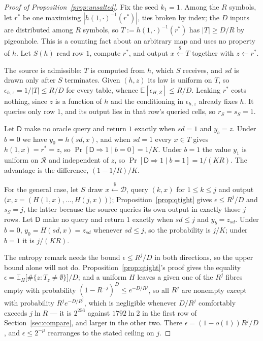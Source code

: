 \documentclass{aicr-solution}
\newcommand{\sd}{\mathit{sd}}
\renewcommand{\sample}{\stackrel{{\scriptscriptstyle\$}}{\leftarrow}}
\newcommand{\calD}{\mathcal{D}}
\newcommand{\calR}{\mathcal{R}}
\begin{document}
\begin{proof}[Proof of Proposition~\ref{prop:unsalted}]
Fix the seed $k_1 = 1$. Among the $R$ symbols, let $r^{*}$ be one maximising
$|h(1,\cdot)^{-1}(r^{*})|$, ties broken by index; the $D$ inputs are distributed among $R$ symbols,
so $T := h(1,\cdot)^{-1}(r^{*})$ has $|T| \ge D/R$ by pigeonhole. This is a counting fact about an
arbitrary map and uses no property of $h$. Let $S(h)$ read row $1$, compute $r^{*}$, and output
$x \sample T$ together with $z \leftarrow r^{*}$.

The source is admissible: $T$ is computed from $h$, which $S$ receives, and $\sd$ is drawn only
after $S$ terminates. Given $(h,z)$ its law is uniform on $T$, so
$\epsilon_{h,z} = 1/|T| \le R/D$ for every table, whence $\mathbb{E}[\epsilon_{H,Z}] \le R/D$.
Leaking $r^{*}$ costs nothing, since $z$ is a function of $h$ and the conditioning in
$\epsilon_{h,z}$ already fixes $h$. It queries only row $1$, and its output lies in that row's
queried cells, so $r_S = s_S = 1$.

Let $\mathsf{D}$ make no oracle query and return $1$ exactly when $\sd = 1$ and $y_b = z$. Under
$b = 0$ we have $y_0 = h(\sd,x)$, and when $\sd = 1$ every $x \in T$ gives $h(1,x) = r^{*} = z$, so
$\Pr[\mathsf{D} \Rightarrow 1 \mid b=0] = 1/K$. Under $b = 1$ the value $y_1$ is uniform on $\calR$
and independent of $z$, so $\Pr[\mathsf{D} \Rightarrow 1 \mid b=1] = 1/(KR)$. The advantage is the
difference, $(1 - 1/R)/K$.

For the general case, let $S$ draw $x \sample \calD$, query $(k,x)$ for $1 \le k \le j$ and output
$\bigl(x, z = (H(1,x),\dots,H(j,x))\bigr)$; Proposition~\ref{prop:qtight} gives
$\epsilon \le R^{j}/D$ and $s_S = j$, the latter because the source queries its own output in
exactly those $j$ rows. Let $\mathsf{D}$ make no query and return $1$ exactly when $\sd \le j$ and
$y_b = z_{\sd}$. Under $b = 0$, $y_0 = H(\sd,x) = z_{\sd}$ whenever $\sd \le j$, so the probability
is $j/K$; under $b = 1$ it is $j/(KR)$.

The entropy remark needs the bound $\epsilon \le R^{j}/D$ in both directions, so the upper bound
alone will not do. Proposition~\ref{prop:qtight}'s proof gives the equality
$\epsilon = \mathbb{E}_{H}\bigl[\#\{z : T_z \neq \emptyset\}\bigr]/D$; and a uniform $H$ leaves a
given one of the $R^{j}$ fibres empty with probability $(1-R^{-j})^{D} \le e^{-D/R^{j}}$, so all
$R^{j}$ are nonempty except with probability $R^{j}e^{-D/R^{j}}$, which is negligible whenever
$D/R^{j}$ comfortably exceeds $j\ln R$ --- it is $2^{256}$ against $1792\ln 2$ in the first row of
Section~\ref{sec:compare}, and larger in the other two. There $\epsilon = (1-o(1))R^{j}/D$, and
$\epsilon \le 2^{-\mu}$ rearranges to the stated ceiling on $j$.
\end{proof}
\end{document}
